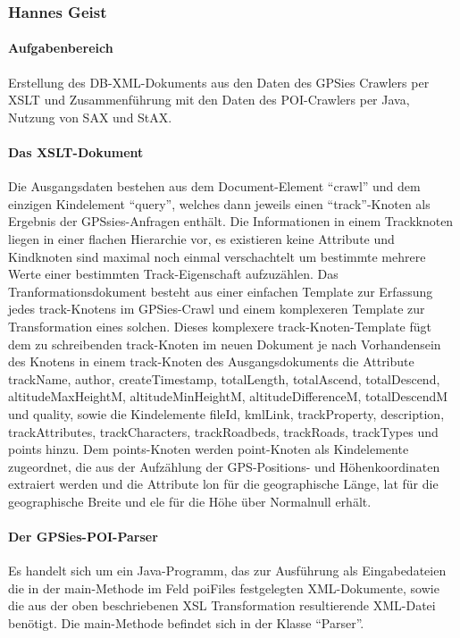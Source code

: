 \subsubsection{Hannes Geist}
\paragraph{Aufgabenbereich}
Erstellung des DB-XML-Dokuments aus den Daten des GPSies Crawlers per XSLT und Zusammenführung mit den Daten des POI-Crawlers per Java, Nutzung von SAX und StAX.

\paragraph{Das XSLT-Dokument}
Die Ausgangsdaten bestehen aus dem Document-Element "`crawl"' und dem einzigen Kindelement "`query"', welches dann jeweils einen "`track"'-Knoten als Ergebnis der GPSsies-Anfragen enthält. Die Informationen in einem Trackknoten liegen in einer flachen Hierarchie vor, es existieren keine Attribute und Kindknoten sind maximal noch einmal verschachtelt um bestimmte mehrere Werte einer bestimmten Track-Eigenschaft aufzuzählen.
Das Tranformationsdokument besteht aus einer einfachen Template zur Erfassung jedes track-Knotens im GPSies-Crawl und einem komplexeren Template zur Transformation eines solchen. Dieses komplexere track-Knoten-Template fügt dem zu schreibenden track-Knoten im neuen Dokument je nach Vorhandensein des Knotens in einem track-Knoten des Ausgangsdokuments die Attribute trackName, author, createTimestamp, totalLength, totalAscend, totalDescend, altitudeMaxHeightM, altitudeMinHeightM, altitudeDifferenceM, totalDescendM und quality, sowie die Kindelemente fileId, kmlLink, trackProperty, description, trackAttributes, trackCharacters, trackRoadbeds, trackRoads, trackTypes und points hinzu. Dem points-Knoten werden point-Knoten als Kindelemente zugeordnet, die aus der Aufzählung der GPS-Positions- und Höhenkoordinaten extraiert werden und die Attribute lon für die geographische Länge, lat für die geographische Breite und ele für die Höhe über Normalnull erhält.

\paragraph{Der GPSies-POI-Parser}
Es handelt sich um ein Java-Programm, das zur Ausführung als Eingabedateien die in der main-Methode im Feld poiFiles festgelegten XML-Dokumente, sowie die aus der oben beschriebenen XSL Transformation resultierende XML-Datei benötigt. Die main-Methode befindet sich in der Klasse "`Parser"'.

